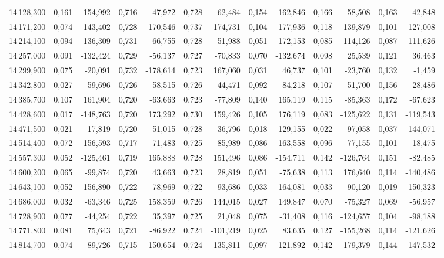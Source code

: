 \begin{longtable}{rrrrrrrrrrrrr}
14\,128,300 & 0,161 & -154,992 & 0,716 & -47,972 & 0,728 & -62,484 & 0,154 & -162,846 & 0,166 & -58,508 & 0,163 & -42,848\\
14\,171,200 & 0,074 & -143,402 & 0,728 & -170,546 & 0,737 & 174,731 & 0,104 & -177,936 & 0,118 & -139,879 & 0,101 & -127,008\\
14\,214,100 & 0,094 & -136,309 & 0,731 & 66,755 & 0,728 & 51,988 & 0,051 & 172,153 & 0,085 & 114,126 & 0,087 & 111,626\\
14\,257,000 & 0,091 & -132,424 & 0,729 & -56,137 & 0,727 & -70,833 & 0,070 & -132,674 & 0,098 & 25,539 & 0,121 & 36,463\\
14\,299,900 & 0,075 & -20,091 & 0,732 & -178,614 & 0,723 & 167,060 & 0,031 & 46,737 & 0,101 & -23,760 & 0,132 & -1,459\\
14\,342,800 & 0,027 & 59,696 & 0,726 & 58,515 & 0,726 & 44,471 & 0,092 & 84,218 & 0,107 & -51,700 & 0,156 & -28,486\\
14\,385,700 & 0,107 & 161,904 & 0,720 & -63,663 & 0,723 & -77,809 & 0,140 & 165,119 & 0,115 & -85,363 & 0,172 & -67,623\\
14\,428,600 & 0,017 & -148,763 & 0,720 & 173,292 & 0,730 & 159,426 & 0,105 & 176,119 & 0,083 & -125,622 & 0,131 & -119,543\\
14\,471,500 & 0,021 & -17,819 & 0,720 & 51,015 & 0,728 & 36,796 & 0,018 & -129,155 & 0,022 & -97,058 & 0,037 & 144,071\\
14\,514,400 & 0,072 & 156,593 & 0,717 & -71,483 & 0,725 & -85,989 & 0,086 & -163,558 & 0,096 & -77,155 & 0,101 & -18,475\\
14\,557,300 & 0,052 & -125,461 & 0,719 & 165,888 & 0,728 & 151,496 & 0,086 & -154,711 & 0,142 & -126,764 & 0,151 & -82,485\\
14\,600,200 & 0,065 & -99,874 & 0,720 & 43,663 & 0,723 & 28,819 & 0,051 & -75,638 & 0,113 & 176,640 & 0,114 & -140,486\\
14\,643,100 & 0,052 & 156,890 & 0,722 & -78,969 & 0,722 & -93,686 & 0,033 & -164,081 & 0,033 & 90,120 & 0,019 & 150,323\\
14\,686,000 & 0,032 & -63,346 & 0,725 & 158,359 & 0,726 & 144,015 & 0,027 & 149,847 & 0,070 & -75,327 & 0,069 & -56,957\\
14\,728,900 & 0,077 & -44,254 & 0,722 & 35,397 & 0,725 & 21,048 & 0,075 & -31,408 & 0,116 & -124,657 & 0,104 & -98,188\\
14\,771,800 & 0,081 & 75,643 & 0,721 & -86,922 & 0,724 & -101,219 & 0,025 & 83,635 & 0,127 & -155,268 & 0,114 & -121,626\\
14\,814,700 & 0,074 & 89,726 & 0,715 & 150,654 & 0,724 & 135,811 & 0,097 & 121,892 & 0,142 & -179,379 & 0,144 & -147,532\\

\end{longtable}

